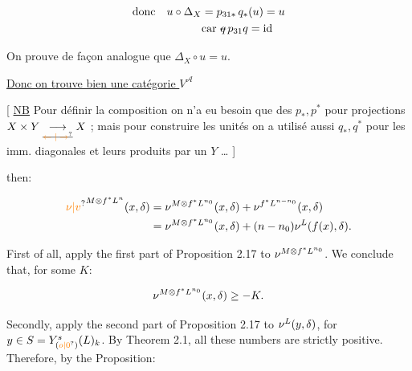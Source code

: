 

\[
\begin{aligned}
\text{donc}\quad u\circ\Delta_X&=p_{31*}\,q_*(u)=u\\
&\text{car }\deleted{q}\,p_{31}q=\mathrm{id}
\end{aligned}
\]

On prouve de façon analogue que $\Delta_X\circ u=u$.

\uline{Donc on trouve bien une catégorie $V^{\mathcal A}$}

[ \uline{NB} Pour définir la composition on n'a eu besoin que des $p_*,p^*$ pour projections $X\times Y\underset{\deleted{\unsure{\leftarrow|\rightarrow}}}{\longrightarrow}X$ ; mais pour  construire les unités on a utilisé aussi $q_*,q^*$ pour les imm. diagonales et leurs produits par un $Y$ \ldots{} ]


then:

\[
\begin{aligned}
\handwritten{\unsure{\nu|v}}^{M\handwritten{\otimes} f^*L^n}(x,\handwritten{\delta})&=\handwritten{\nu}^{M\handwritten{\otimes}f^*L^{\handwritten{n_0}}}(x,\handwritten{\delta})+\handwritten{\nu}^{f^*L^{\handwritten{n-n_0}}}(x,\handwritten{\delta})\\
&=\handwritten{\nu}^{M\handwritten{\otimes}f^*L^{\handwritten{n_0}}}(x,\handwritten{\delta})+(n-n_0)\handwritten{\nu}^{L}(f(x),\handwritten{\delta}).
\end{aligned}
\]

First of all, apply the first part of Proposition 2.17 to $\nu^{M\otimes f^*L^{n_0}}$. We conclude that, for some $K$:

\[
\nu^{M\otimes f^*L^{n_0}}(x,\delta)\geq-K.
\]

Secondly, apply the second part of Proposition 2.17 to $\nu^L(y,\delta)$, for $y\in S=Y^s_{(\unsure{o|0})}(L)_k$. By Theorem 2.1, all these numbers are strictly positive. Therefore, by the Proposition:

